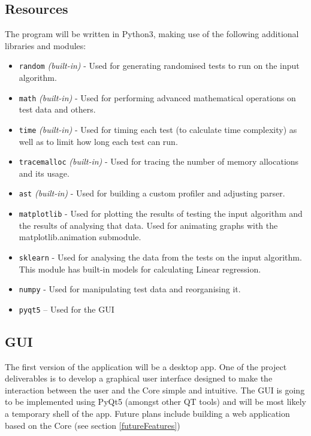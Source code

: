 \documentclass{article}
\begin{document}
        \subsection{Resources}
            The program will be written in Python3, making use of the following additional libraries and modules:
            \begin{itemize}
                \item \verb|random| \textit{(built-in)} - Used for generating randomised tests to run on the input algorithm.
                \item \verb|math| \textit{(built-in)} - Used for performing advanced mathematical operations on test data and others.
                \item \verb|time| \textit{(built-in)} - Used for timing each test (to calculate time complexity) as well as to limit how long each test can run.
                \item \verb|tracemalloc| \textit{(built-in)} - Used for tracing the number of memory allocations and its usage.
                \item \verb|ast| \textit{(built-in)} - Used for building a custom profiler and adjusting parser.
                \item \verb|matplotlib| - Used for plotting the results of testing the input algorithm and the results of analysing that data. Used for animating graphs with the matplotlib.animation submodule.
                \item \verb|sklearn| - Used for analysing the data from the tests on the input algorithm. This module has built-in models for calculating Linear regression.
                \item \verb|numpy| - Used for manipulating test data and reorganising it.
                \item \verb|pyqt5| – Used for the GUI
            \end{itemize}
    
        \subsection{GUI}
            The first version of the application will be a desktop app. One of the project deliverables is to develop a graphical user interface designed to make the interaction between the user and the Core simple and intuitive. The GUI is going to be implemented using PyQt5 (amongst other QT tools) and will be most likely a temporary shell of the app. Future plans include building a web application based on the Core (see section \ref{futureFeatures}) \\
            
\end{document}
